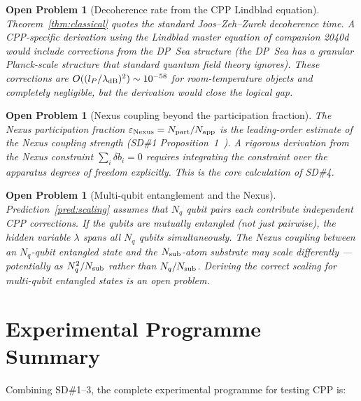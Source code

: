\documentclass[11pt,letterpaper]{article}
\newtheorem{openprob}[theorem]{Open Problem}
\newcommand{\lP}{l_P}
\newcommand{\eps}{\varepsilon}
\begin{document}
\begin{openprob}[Decoherence rate from the CPP Lindblad equation]
\label{op:decoherence_rate}
Theorem~\ref{thm:classical} quotes the standard
Joos--Zeh--Zurek decoherence time.  A CPP-specific derivation
using the Lindblad master equation of companion 2040d~\citep{cpp2040d}
would include corrections from the DP~Sea structure (the DP~Sea
has a granular Planck-scale structure that standard quantum
field theory ignores).  These corrections are $O((\lP/\lambda_{\rm
dB})^2) \sim 10^{-58}$ for room-temperature objects and completely
negligible, but the derivation would close the logical gap.
\end{openprob}

\begin{openprob}[Nexus coupling beyond the participation fraction]
\label{op:nexus_coupling}
The Nexus participation fraction $\eps_{\rm Nexus} = N_{\rm part}
/ N_{\rm app}$ is the leading-order estimate of the Nexus coupling
strength (SD\#1 Proposition~1~\citep{cpp_sd1}).  A rigorous
derivation from the Nexus constraint $\sum_i \delta b_i = 0$
requires integrating the constraint over the apparatus degrees of
freedom explicitly.  This is the core calculation of SD\#4.
\end{openprob}

\begin{openprob}[Multi-qubit entanglement and the Nexus]
\label{op:multiqubit}
Prediction~\ref{pred:scaling} assumes that $N_q$ qubit pairs each
contribute independent CPP corrections.  If the qubits are
\emph{mutually entangled} (not just pairwise), the hidden variable
$\lambda$ spans all $N_q$ qubits simultaneously.  The Nexus
coupling between an $N_q$-qubit entangled state and the $N_{\rm
sub}$-atom substrate may scale differently --- potentially as
$N_q^2/N_{\rm sub}$ rather than $N_q/N_{\rm sub}$.  Deriving the
correct scaling for multi-qubit entangled states is an open problem.
\end{openprob}

\section{Experimental Programme Summary}

Combining SD\#1--3, the complete experimental programme for testing
CPP is:
\end{document}
